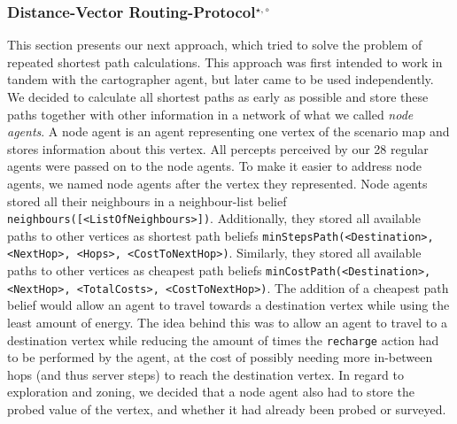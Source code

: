\subsubsection[Distance-Vector Routing Protocol]{Distance-Vector Routing-Protocol$^{\star,\circ}$}\label{alg:map_dv}
This section presents our next approach, which tried to solve the problem of repeated shortest path calculations.
This approach was first intended to work in tandem with the cartographer agent, but later came to be used independently.
We decided to calculate all shortest paths as early as possible and store these paths together with other information in a network of what we called \emph{node agents}.
A node agent is an agent representing one vertex of the scenario map and stores information about this vertex.
All percepts perceived by our 28 regular agents were passed on to the node agents.
To make it easier to address node agents, we named node agents after the vertex they represented.
Node agents stored all their neighbours in a neighbour-list belief \texttt{neighbours([<ListOfNeighbours>])}.
Additionally, they stored all available paths to other vertices as shortest path beliefs \texttt{minStepsPath(<Destination>, <NextHop>, <Hops>, <CostToNextHop>)}.
Similarly, they stored all available paths to other vertices as cheapest path beliefs \texttt{minCostPath(<Destination>, <NextHop>, <TotalCosts>, <CostToNextHop>)}.
The addition of a cheapest path belief would allow an agent to travel towards a destination vertex while using the least amount of energy.
The idea behind this was to allow an agent to travel to a destination vertex while reducing the amount of times the \texttt{recharge} action had to be performed by the agent, at the cost of possibly needing more in-between hops (and thus server steps) to reach the destination vertex.
In regard to exploration and zoning, we decided that a node agent also had to store the probed value of the vertex, and whether it had already been probed or surveyed.

